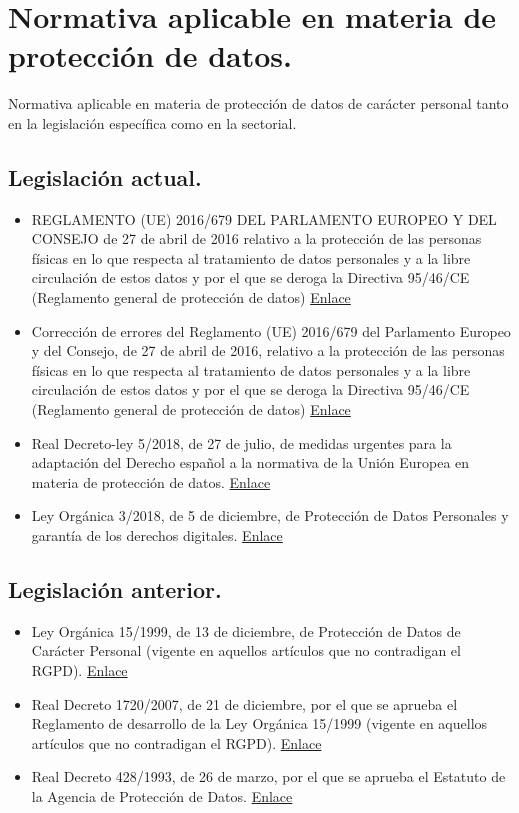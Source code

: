 \section{Normativa aplicable en materia de protección de datos.}
	Normativa aplicable en materia de protección de datos de carácter personal tanto en la legislación específica como en la sectorial.
	\subsection{Legislación actual.}
		\begin{itemize}
			\item REGLAMENTO (UE) 2016/679 DEL PARLAMENTO EUROPEO Y DEL CONSEJO de 27 de abril de 2016 relativo a la protección de las personas físicas en lo que respecta al tratamiento de datos personales y a la libre circulación de estos datos y por el que se deroga la Directiva 95/46/CE (Reglamento general de protección de datos) \href{https://www.boe.es/buscar/doc.php?id=DOUE-L-2016-80807}{Enlace}
			\item Corrección de errores del Reglamento (UE) 2016/679 del Parlamento Europeo y del Consejo, de 27 de abril de 2016, relativo a la protección de las personas físicas en lo que respecta al tratamiento de datos personales y a la libre circulación de estos datos y por el que se deroga la Directiva 95/46/CE (Reglamento general de protección de datos) \href{https://eur-lex.europa.eu/legal-content/ES/TXT/PDF/?uri=CELEX:32016R0679R(02)&from=ES}{Enlace}
			\item Real Decreto-ley 5/2018, de 27 de julio, de medidas urgentes para la adaptación del Derecho español a la normativa de la Unión Europea en materia de protección de datos. \href{https://www.boe.es/buscar/doc.php?id=BOE-A-2018-10751}{Enlace}
			\item Ley Orgánica 3/2018, de 5 de diciembre, de Protección de Datos Personales y garantía de los derechos digitales. \href{https://www.boe.es/buscar/doc.php?id=BOE-A-2018-16673}{Enlace}
		\end{itemize}
	\subsection{Legislación anterior.}
		\begin{itemize}
			\item Ley Orgánica 15/1999, de 13 de diciembre, de Protección de Datos de Carácter Personal (vigente en aquellos artículos que no contradigan el RGPD). \href{https://www.boe.es/buscar/act.php?id=BOE-A-1999-23750}{Enlace}
			\item Real Decreto 1720/2007, de 21 de diciembre, por el que se aprueba el Reglamento de desarrollo de la Ley Orgánica 15/1999 (vigente en aquellos artículos que no contradigan el RGPD). \href{https://www.boe.es/buscar/act.php?id=BOE-A-2008-979}{Enlace}
			\item Real Decreto 428/1993, de 26 de marzo, por el que se aprueba el Estatuto de la Agencia de Protección de Datos. \href{https://www.boe.es/buscar/doc.php?id=BOE-A-1993-11252}{Enlace}
		\end{itemize}

